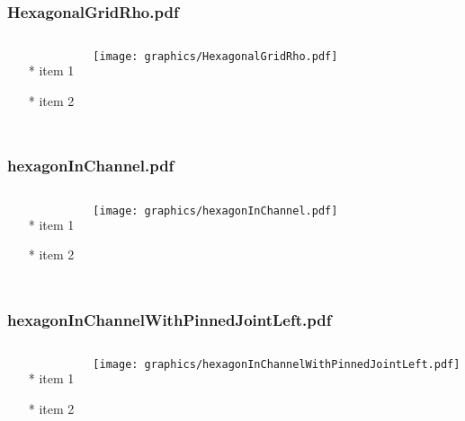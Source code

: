 \documentclass{beamer}
\begin{document}
\begin{frame} \frametitle{HexagonalGridRho.pdf}
    \begin{columns}[c]
        \begin{itemize}
            \item[*] item 1
            \item[*] item 2
        \end{itemize}
        \begin{minipage}{\linewidth}
            \begin{center}
            \texttt{[image: graphics/HexagonalGridRho.pdf]}
            \label{gfx:HexagonalGridRho.pdf}
            \end{center}
        \end{minipage}
    \end{columns}
\end{frame}
\begin{frame} \frametitle{hexagonInChannel.pdf}
    \begin{columns}[c]
        \begin{itemize}
            \item[*] item 1
            \item[*] item 2
        \end{itemize}
        \begin{minipage}{\linewidth}
            \begin{center}
            \texttt{[image: graphics/hexagonInChannel.pdf]}
            \label{gfx:hexagonInChannel.pdf}
            \end{center}
        \end{minipage}
    \end{columns}
\end{frame}
\begin{frame} \frametitle{hexagonInChannelWithPinnedJointLeft.pdf}
    \begin{columns}[c]
        \begin{itemize}
            \item[*] item 1
            \item[*] item 2
        \end{itemize}
        \begin{minipage}{\linewidth}
            \begin{center}
            \texttt{[image: graphics/hexagonInChannelWithPinnedJointLeft.pdf]}
            \label{gfx:hexagonInChannelWithPinnedJointLeft.pdf}
            \end{center}
        \end{minipage}
    \end{columns}
\end{frame}
\end{document}
